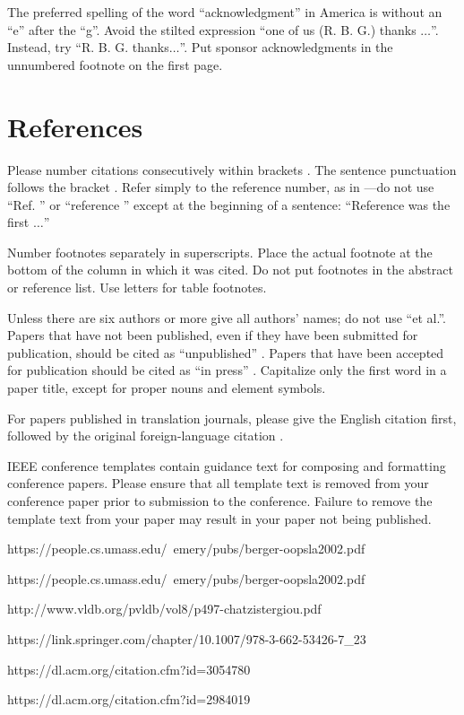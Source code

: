 \documentclass[conference]{IEEEtran}
\begin{document}
The preferred spelling of the word ``acknowledgment'' in America is without 
an ``e'' after the ``g''. Avoid the stilted expression ``one of us (R. B. 
G.) thanks $\ldots$''. Instead, try ``R. B. G. thanks$\ldots$''. Put sponsor 
acknowledgments in the unnumbered footnote on the first page.

\section*{References}

Please number citations consecutively within brackets \cite{IEEEhowto:IEEEtranpage}. The 
sentence punctuation follows the bracket \cite{b2}. Refer simply to the reference 
number, as in \cite{b3}---do not use ``Ref. \cite{b3}'' or ``reference \cite{b3}'' except at 
the beginning of a sentence: ``Reference \cite{b3} was the first $\ldots$''

Number footnotes separately in superscripts. Place the actual footnote at 
the bottom of the column in which it was cited. Do not put footnotes in the 
abstract or reference list. Use letters for table footnotes.

Unless there are six authors or more give all authors' names; do not use 
``et al.''. Papers that have not been published, even if they have been 
submitted for publication, should be cited as ``unpublished'' \cite{b4}. Papers 
that have been accepted for publication should be cited as ``in press'' \cite{b5}. 
Capitalize only the first word in a paper title, except for proper nouns and 
element symbols.

For papers published in translation journals, please give the English 
citation first, followed by the original foreign-language citation \cite{b6}.




\vspace{12pt}
\color{red}
IEEE conference templates contain guidance text for composing and formatting conference papers. Please ensure that all template text is removed from your conference paper prior to submission to the conference. Failure to remove the template text from your paper may result in your paper not being published.

https://people.cs.umass.edu/~emery/pubs/berger-oopsla2002.pdf

https://people.cs.umass.edu/~emery/pubs/berger-oopsla2002.pdf

http://www.vldb.org/pvldb/vol8/p497-chatzistergiou.pdf

https://link.springer.com/chapter/10.1007/978-3-662-53426-7_23

https://dl.acm.org/citation.cfm?id=3054780

https://dl.acm.org/citation.cfm?id=2984019
\end{document}
